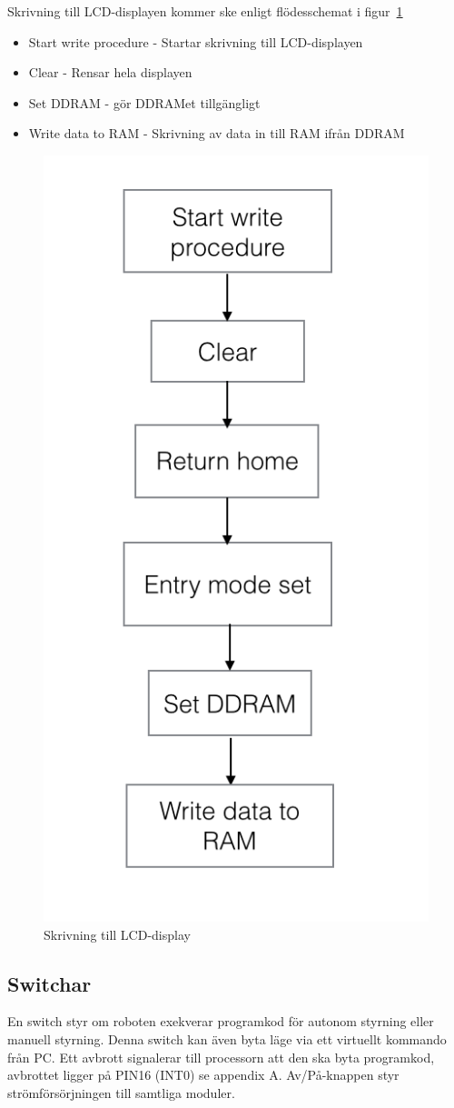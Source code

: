 \documentclass[a4paper,12pt,fleqn]{article}
\begin{document}
Skrivning till LCD-displayen kommer ske enligt flödesschemat i figur~\ref{fig:flowlcdwrite}
\begin{itemize}
  \item Start write procedure - Startar skrivning till LCD-displayen
  \item Clear - Rensar hela displayen
  \item Set DDRAM - gör DDRAMet tillgängligt
  \item Write data to RAM - Skrivning av data in till RAM ifrån DDRAM
\end{itemize}

\begin{figure}[htp] %
  \begin{center}
  \includegraphics[keepaspectratio=true,width=0.5\linewidth]{bilder/write}  %
  \end{center}
  \caption{Skrivning till LCD-display} %
  \label{fig:flowlcdwrite}
\end{figure}


\subsection{Switchar}
En switch styr om roboten exekverar programkod för autonom styrning eller manuell styrning. Denna switch kan även byta läge via ett virtuellt kommando från PC. Ett avbrott signalerar till processorn att den ska byta programkod, avbrottet ligger på PIN16 (INT0) se appendix A. Av/På-knappen styr strömförsörjningen till samtliga moduler. 
\end{document}
